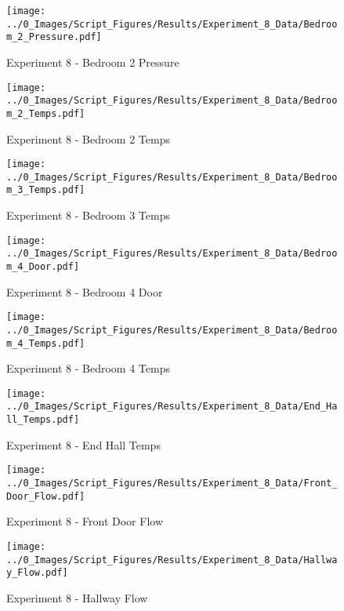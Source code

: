 	\clearpage

	\begin{figure}[H]
		\centering
		\texttt{[image: ../0\_Images/Script\_Figures/Results/Experiment\_8\_Data/Bedroom\_2\_Pressure.pdf]}
		\caption[]{Experiment 8 - Bedroom 2 Pressure}
	\end{figure}
 

	\begin{figure}[H]
		\centering
		\texttt{[image: ../0\_Images/Script\_Figures/Results/Experiment\_8\_Data/Bedroom\_2\_Temps.pdf]}
		\caption[]{Experiment 8 - Bedroom 2 Temps}
	\end{figure}
 
	\clearpage

	\begin{figure}[H]
		\centering
		\texttt{[image: ../0\_Images/Script\_Figures/Results/Experiment\_8\_Data/Bedroom\_3\_Temps.pdf]}
		\caption[]{Experiment 8 - Bedroom 3 Temps}
	\end{figure}
 

	\begin{figure}[H]
		\centering
		\texttt{[image: ../0\_Images/Script\_Figures/Results/Experiment\_8\_Data/Bedroom\_4\_Door.pdf]}
		\caption[]{Experiment 8 - Bedroom 4 Door}
	\end{figure}
 
	\clearpage

	\begin{figure}[H]
		\centering
		\texttt{[image: ../0\_Images/Script\_Figures/Results/Experiment\_8\_Data/Bedroom\_4\_Temps.pdf]}
		\caption[]{Experiment 8 - Bedroom 4 Temps}
	\end{figure}
 

	\begin{figure}[H]
		\centering
		\texttt{[image: ../0\_Images/Script\_Figures/Results/Experiment\_8\_Data/End\_Hall\_Temps.pdf]}
		\caption[]{Experiment 8 - End Hall Temps}
	\end{figure}
 
	\clearpage

	\begin{figure}[H]
		\centering
		\texttt{[image: ../0\_Images/Script\_Figures/Results/Experiment\_8\_Data/Front\_Door\_Flow.pdf]}
		\caption[]{Experiment 8 - Front Door Flow}
	\end{figure}
 

	\begin{figure}[H]
		\centering
		\texttt{[image: ../0\_Images/Script\_Figures/Results/Experiment\_8\_Data/Hallway\_Flow.pdf]}
		\caption[]{Experiment 8 - Hallway Flow}
	\end{figure}
 
